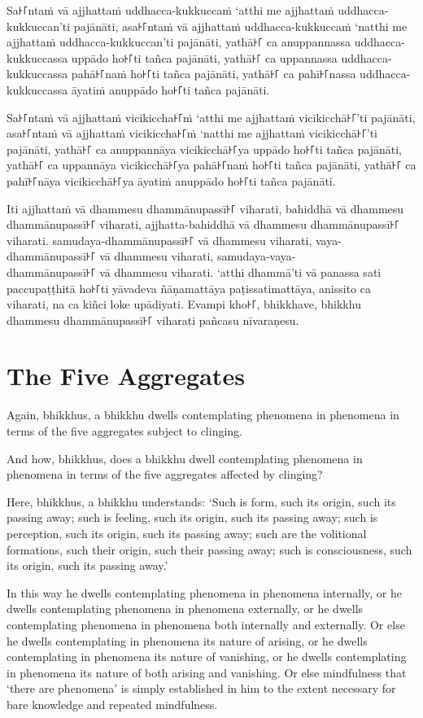 \paliPage

Sa꜔꜒ntaṁ vā ajjhattaṁ uddhacca-kukkuccaṁ ‘atthi me ajjhattaṁ uddhacca-kukkuccan’ti pajānāti,
asa꜔꜒ntaṁ vā ajjhattaṁ uddhacca-kukkuccaṁ ‘natthi me ajjhattaṁ uddhacca-kukkuccan’ti pajānāti,
yathā꜔꜒ ca anuppannassa uddhacca-kukkuccassa uppādo ho꜔꜒ti tañca pajānāti,
yathā꜔꜒ ca uppannassa uddhacca-kukkuccassa pahā꜔꜒naṁ ho꜔꜒ti tañca pajānāti,
yathā꜔꜒ ca pahī꜔꜒nassa uddhacca-kukkuccassa āyatiṁ anuppādo ho꜔꜒ti tañca pajānāti.

Sa꜔꜒ntaṁ vā ajjhattaṁ vicikiccha꜔꜒ṁ ‘atthi me ajjhattaṁ vicikicchā꜔꜒’ti pajānāti,
asa꜔꜒ntaṁ vā ajjhattaṁ vicikiccha꜔꜒ṁ ‘natthi me ajjhattaṁ vicikicchā꜔꜒’ti pajānāti,
yathā꜔꜒ ca anuppannāya vicikicchā꜔꜒ya uppādo ho꜔꜒ti tañca pajānāti,
yathā꜔꜒ ca uppannāya vicikicchā꜔꜒ya pahā꜔꜒naṁ ho꜔꜒ti tañca pajānāti,
yathā꜔꜒ ca pahī꜔꜒nāya vicikicchā꜔꜒ya āyatiṁ anuppādo ho꜔꜒ti tañca pajānāti.

Iti ajjhattaṁ vā dhammesu dhammānupassī꜔꜒ viharati,
bahiddhā vā dhammesu dhammānupassī꜔꜒ viharati,
ajjhatta-bahiddhā vā dhammesu dhammānupassī꜔꜒ viharati.
samudaya-dhammānupassī꜔꜒ vā dhammesu viharati,
vaya-dhammānupassī꜔꜒ vā dhammesu viharati,
samudaya-vaya-\\ dhammānupassī꜔꜒ vā dhammesu viharati.
‘atthi dhammā’ti vā panassa sati paccupaṭṭhitā ho꜔꜒ti
yāvadeva ñāṇamattāya paṭissatimattāya, anissito ca viharati,
na ca kiñci loke upādiyati. Evampi kho꜔꜒, bhikkhave, bhikkhu
dhammesu dhammānupassī꜔꜒ viharati pañcasu nīvaraṇesu.


\englishPage
\section{The Five Aggregates}

Again, bhikkhus, a bhikkhu dwells contemplating phenomena in phenomena in terms
of the five aggregates subject to clinging.

And how, bhikkhus, does a bhikkhu dwell contemplating phenomena in phenomena in
terms of the five aggregates affected by clinging?

Here, bhikkhus, a bhikkhu understands:
`Such is form, such its origin, such its passing away;
such is feeling, such its origin, such its passing away;
such is perception, such its origin, such its passing away;
such are the volitional formations, such their origin, such their passing away;
such is consciousness, such its origin, such its passing away.'

In this way he dwells contemplating phenomena in phenomena internally, or he
dwells contemplating phenomena in phenomena externally, or he dwells
contemplating phenomena in phenomena both internally and externally. Or else he
dwells contemplating in phenomena its nature of arising, or he dwells
contemplating in phenomena its nature of vanishing, or he dwells contemplating
in phenomena its nature of both arising and vanishing. Or else mindfulness that
‘there are phenomena’ is simply established in him to the extent necessary for
bare knowledge and repeated mindfulness.

